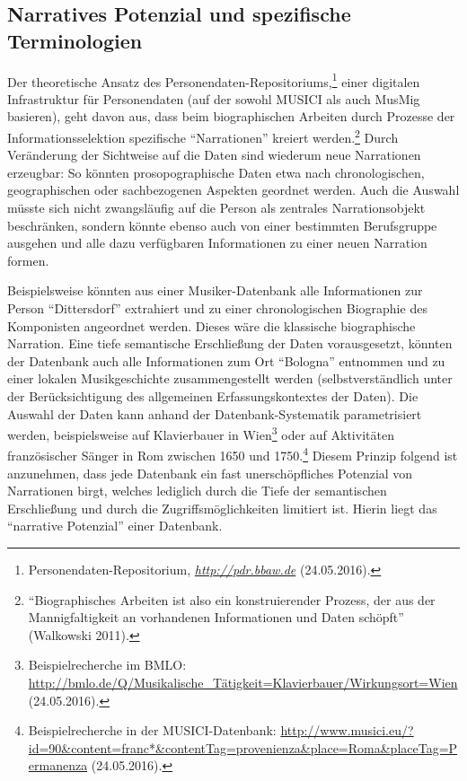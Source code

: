\documentclass[a4paper,
fontsize=11pt,
oneside,
numbers=noperiodatend,
parskip=half-,
bibliography=totoc,
final
]{scrartcl}
\begin{document}
\subsection*{Narratives Potenzial und spezifische
Terminologien}\label{narratives-potenzial-und-spezifische-terminologien}

Der theoretische Ansatz des Personendaten-Repositoriums,\footnote{Personendaten-Repositorium,
  \href{http://pdr.bbaw.de/}{\emph{http://pdr.bbaw.de}} (24.05.2016).}
einer digitalen Infrastruktur für Personendaten (auf der sowohl MUSICI
als auch MusMig basieren), geht davon aus, dass beim biographischen
Arbeiten durch Prozesse der Informationsselektion spezifische
\enquote{Narrationen} kreiert werden.\footnote{\enquote{Biographisches
  Arbeiten ist also ein konstruierender Prozess, der aus der
  Mannigfaltigkeit an vorhandenen Informationen und Daten schöpft}
  (Walkowski 2011).} Durch Veränderung der Sichtweise auf die Daten sind
wiederum neue Narrationen erzeugbar: So könnten prosopographische Daten
etwa nach chronologischen, geographischen oder sachbezogenen Aspekten
geordnet werden. Auch die Auswahl müsste sich nicht zwangsläufig auf die
Person als zentrales Narrationsobjekt beschränken, sondern könnte ebenso
auch von einer bestimmten Berufsgruppe ausgehen und alle dazu
verfügbaren Informationen zu einer neuen Narration formen.

Beispielsweise könnten aus einer Musiker-Datenbank alle Informationen
zur Person \enquote{Dittersdorf} extrahiert und zu einer chronologischen
Biographie des Komponisten angeordnet werden. Dieses wäre die klassische
biographische Narration. Eine tiefe semantische Erschließung der Daten
vorausgesetzt, könnten der Datenbank auch alle Informationen zum Ort
\enquote{Bologna} entnommen und zu einer lokalen Musikgeschichte
zusammengestellt werden (selbstverständlich unter der Berücksichtigung
des allgemeinen Erfassungskontextes der Daten). Die Auswahl der Daten
kann anhand der Datenbank-Systematik parametrisiert werden,
beispielsweise auf Klavierbauer in Wien\footnote{Beispielrecherche im
  BMLO:
  \url{http://bmlo.de/Q/Musikalische_Tätigkeit=Klavierbauer/Wirkungsort=Wien}
  (24.05.2016).} oder auf Aktivitäten französischer Sänger in Rom
zwischen 1650 und 1750.\footnote{Beispielrecherche in der
  MUSICI-Daten\-bank:
  \url{http://www.musici.eu/?id=90\&content=franc*\&contentTag=provenienza\&place=Roma\&placeTag=Permanenza}
  (24.05.2016).} Diesem Prinzip folgend ist anzunehmen, dass jede
Datenbank ein fast unerschöpfliches Potenzial von Narrationen birgt,
welches lediglich durch die Tiefe der semantischen Erschließung und
durch die Zugriffsmöglichkeiten limitiert ist. Hierin liegt das
\enquote{narrative Potenzial} einer Datenbank.
\end{document}
